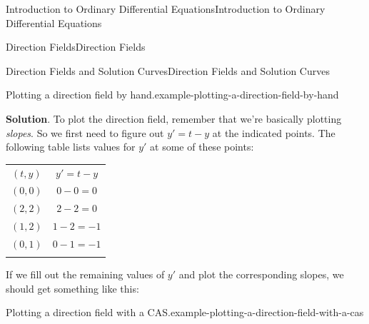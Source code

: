 \documentclass[10pt,]{book}
\numberwithin{equation}{section}
\newcommand{\hrulethin}  {\noalign{\hrule height 0.04em}}
\newcommand{\hrulethick} {\noalign{\hrule height 0.11em}}
\begin{document}
\begin{chapterptx}{Introduction to Ordinary Differential Equations}{}{Introduction to Ordinary Differential Equations}{}{}
\begin{sectionptx}{Direction Fields}{}{Direction Fields}{}{}
\begin{subsectionptx}{Direction Fields and Solution Curves}{}{Direction Fields and Solution Curves}{}{}
\begin{example}{Plotting a direction field by hand.}{example-plotting-a-direction-field-by-hand}
\begin{figure}
\centering
{
}
\end{figure}
\par\smallskip%
\noindent\textbf{Solution}.\hypertarget{solution-6}{}\quad%
\hypertarget{p-42}{}%
To plot the direction field, remember that we're basically plotting \emph{slopes}. So we first need to figure out \(y' = t-y\) at the indicated points. The following table lists values for \(y'\) at some of these points: \begin{table}
\centering
\begin{tabular}{cc}\hrulethick
\((t,y)\)&\(y' = t-y\)\tabularnewline\hrulethin
\((0,0)\)&\(0-0 = 0\)\tabularnewline\hrulethin
\((2,2)\)&\(2-2=0\)\tabularnewline\hrulethin
\((1,2)\)&\(1-2 = -1\)\tabularnewline\hrulethin
\((0,1)\)&\(0-1=-1\)\tabularnewline\hrulethick
\end{tabular}
\end{table}
 If we fill out the remaining values of \(y'\) and plot the corresponding slopes, we should get something like this:%
\begin{figure}
\centering
{
\def\length{sqrt(1+(x-y)^2)}
}
\end{figure}
\end{example}
\begin{example}{Plotting a direction field with a CAS.}{example-plotting-a-direction-field-with-a-cas}%

\end{example}
\end{subsectionptx}
\end{sectionptx}
\end{chapterptx}
\end{document}
